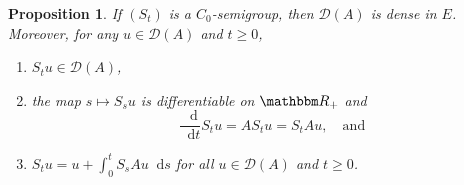 \documentclass[12pt, reqno]{amsart}
\renewcommand{\geq}{\geqslant}
\newcommand{\1}{\mathbbm 1}
\newcommand*\diff{\mathop{}\!\mathrm{d}}
\newcommand{\dD}{\mathcal D}
\newcommand{\RR}{\mathbbm R}
\theoremstyle{plain}
\newtheorem{proposition}[theorem]{Proposition}
\theoremstyle{definition}
\begin{document}
\begin{proposition}\label{p:diffpath2}
    If $(S_t)$ is a $C_0$-semigroup, then $\dD(A)$ is dense in $E$.  Moreover,  for any
    $u \in \dD(A)$ and $t \geq 0$,
    \begin{enumerate}
        \item $S_t u \in \dD(A)$,
        \item the map $s \mapsto S_s u$ is differentiable on $\RR_+$ and
            \begin{equation}\label{eq:eqdiff}
                \frac{\diff}{\diff t} S_t u
                = A S_t u = S_t A u,
                \quad \text{and}
            \end{equation}
        \item $S_t u = u + \int_0^t S_s A u \diff s$ for all $u \in \dD(A)$ and $t \geq 0$.
    \end{enumerate}
\end{proposition}
\end{document}
